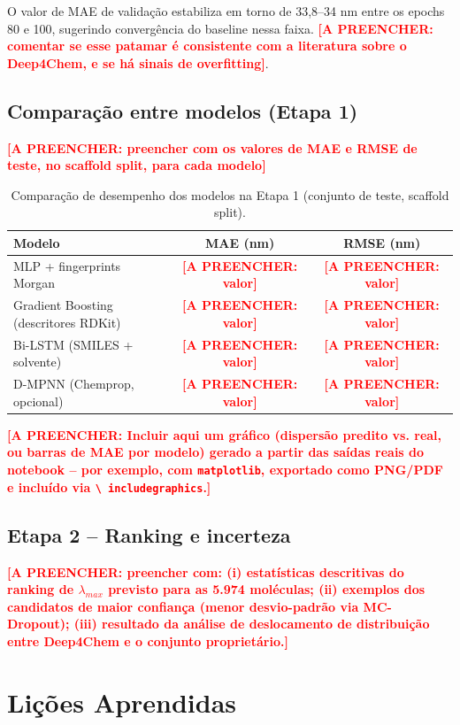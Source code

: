\documentclass[12pt]{article}
\newcommand{\preencher}[1]{\textcolor{red}{\bfseries [A PREENCHER: #1]}}
\begin{document}
O valor de MAE de validação estabiliza em torno de 33,8--34 nm entre os epochs 80 e 100,
sugerindo convergência do baseline nessa faixa. \preencher{comentar se esse patamar é
consistente com a literatura sobre o Deep4Chem, e se há sinais de overfitting}.

\subsection{Comparação entre modelos (Etapa 1)}

\preencher{preencher com os valores de MAE e RMSE de teste, no scaffold split, para cada
modelo}

\begin{table}[ht]
\centering
\caption{Comparação de desempenho dos modelos na Etapa 1 (conjunto de teste, scaffold
split).}
\label{tab:comparacao}
\begin{tabular}{lcc}
\toprule
Modelo & MAE (nm) & RMSE (nm) \\
\midrule
MLP + fingerprints Morgan          & \preencher{valor} & \preencher{valor} \\
Gradient Boosting (descritores RDKit) & \preencher{valor} & \preencher{valor} \\
Bi-LSTM (SMILES + solvente)        & \preencher{valor} & \preencher{valor} \\
D-MPNN (Chemprop, opcional)        & \preencher{valor} & \preencher{valor} \\
\bottomrule
\end{tabular}
\end{table}

\preencher{Incluir aqui um gráfico (dispersão predito vs. real, ou barras de MAE por
modelo) gerado a partir das saídas reais do notebook -- por exemplo, com
\texttt{matplotlib}, exportado como PNG/PDF e incluído via \texttt{\textbackslash
includegraphics}.}

\subsection{Etapa 2 -- Ranking e incerteza}

\preencher{preencher com: (i) estatísticas descritivas do ranking de $\lambda_{max}$
previsto para as 5.974 moléculas; (ii) exemplos dos candidatos de maior confiança
(menor desvio-padrão via MC-Dropout); (iii) resultado da análise de deslocamento de
distribuição entre Deep4Chem e o conjunto proprietário.}


\section{Lições Aprendidas}
\label{sec:licoes}
\end{document}
